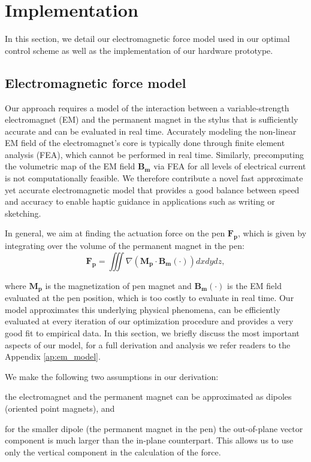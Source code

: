 \section{Implementation} \label{sec:Implementation}
In this section, we detail our electromagnetic force model used in our optimal control scheme as well as the implementation of our hardware prototype.

\subsection{Electromagnetic force model}\label{sc:em_model}
Our approach requires a model of the interaction between a variable-strength electromagnet (EM) and the permanent magnet in the stylus that is sufficiently accurate and can be evaluated in real time.
Accurately modeling the non-linear EM field of the electromagnet's core is typically done through finite element analysis (FEA), which cannot be performed in real time.
Similarly, precomputing the volumetric map of the EM field $\mathbf{B_m}$ via FEA for all levels of electrical current is not computationally feasible.
We therefore contribute a novel fast approximate yet accurate electromagnetic model that provides a good balance between speed and accuracy to enable haptic guidance in applications such as writing or sketching.

In general, we aim at finding the actuation force on the pen $\mathbf{F_p}$, which is given by integrating over the volume of the permanent magnet in the pen:
\begin{equation}
    \mathbf{F_p} = \iiint \nabla \left( \mathbf{M_p} \cdot  \mathbf{B_m}(\cdot)\right) dxdydz , \label{eq:gradB2}
\end{equation}

\noindent where $\mathbf{M_p}$ is the magnetization of pen magnet and $\mathbf{B_m(\cdot)}$ is the EM field evaluated at the pen position, which is too costly to evaluate in real time.
Our model approximates this underlying physical phenomena, can be efficiently evaluated at every iteration of our optimization procedure and provides a very good fit to empirical data.
In this section, we briefly discuss the most important aspects of our model, for a full derivation and analysis we refer readers to the Appendix \ref{ap:em_model}.

We make the following two assumptions in our derivation:
\begin{inparaenum}[1)]
    \item the electromagnet and the permanent magnet can be approximated as dipoles (\ie oriented point magnets), and
    \item for the smaller dipole (the permanent magnet in the pen) the out-of-plane vector component is much larger than the in-plane counterpart. This allows us to use only the vertical component in the calculation of the force.
\end{inparaenum}

